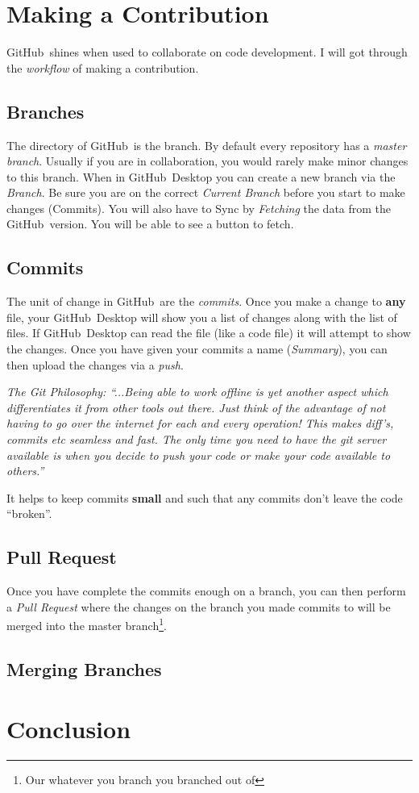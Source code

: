 \documentclass{article}
\newcommand{\gh}{GitHub~}
\begin{document}
\section{Making a Contribution}

\gh shines when used to collaborate on code development. I will got through the \textit{workflow} of making a contribution.

\subsection{Branches}

The directory of \gh is the branch. By default every repository has a \textit{master branch}. Usually if you are in collaboration, you would rarely make minor changes to this branch. When in \gh Desktop you can create a new branch via the \textit{Branch}. Be sure you are on the correct \textit{Current Branch} before you start to make changes (Commits). You will also have to Sync by \textit{Fetching} the data from the \gh version. You will be able to see a button to fetch.

\subsection{Commits}

The unit of change in \gh are the \textit{commits}. Once you make a change to \textbf{any} file, your \gh Desktop will show you a list of changes along with the list of files. If \gh Desktop can read the file (like a code file) it will attempt to show the changes. Once you have given your commits a name (\textit{Summary}), you can then upload the changes via a \textit{push}.

\textit{The Git Philosophy: ``...Being able to work offline is yet another aspect which differentiates it from other tools out there. Just think of the advantage of not having to go over the internet for each and every operation! This makes diff’s, commits etc seamless and fast. The only time you need to have the git server available is when you decide to push your code or make your code available to others.''}

It helps to keep commits \textbf{small} and such that any commits don't leave the code ``broken''.

\subsection{Pull Request}

Once you have complete the commits enough on a branch, you can then perform a \textit{Pull Request} where the changes on the branch you made commits to will be merged into the master branch\footnote{Our whatever you branch you branched out of}.

\subsection{Merging Branches}

\section{Conclusion}
\end{document}
